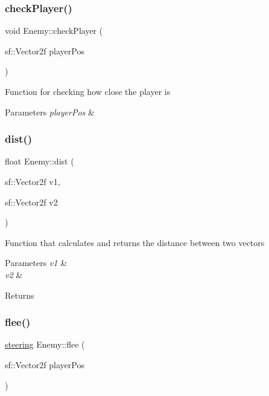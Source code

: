 \subsubsection{\texorpdfstring{checkPlayer()}{checkPlayer()}}
{\footnotesize\ttfamily void Enemy\+::check\+Player (\begin{DoxyParamCaption}\item[{sf\+::\+Vector2f}]{player\+Pos }\end{DoxyParamCaption})}



Function for checking how close the player is 


\begin{DoxyParams}{Parameters}
{\em player\+Pos} & \\
\hline
\end{DoxyParams}
\mbox{\label{class_enemy_a20f703afc06d0024fdfad521738f9a06}} 
\subsubsection{\texorpdfstring{dist()}{dist()}}
{\footnotesize\ttfamily float Enemy\+::dist (\begin{DoxyParamCaption}\item[{sf\+::\+Vector2f}]{v1,  }\item[{sf\+::\+Vector2f}]{v2 }\end{DoxyParamCaption})}



Function that calculates and returns the distance between two vectors 


\begin{DoxyParams}{Parameters}
{\em v1} & \\
\hline
{\em v2} & \\
\hline
\end{DoxyParams}
\begin{DoxyReturn}{Returns}

\end{DoxyReturn}
\mbox{\label{class_enemy_abf2799c252b07c51054dea9b6d5cdfee}} 
\subsubsection{\texorpdfstring{flee()}{flee()}}
{\footnotesize\ttfamily \mbox{\hyperlink{structsteering}{steering}} Enemy\+::flee (\begin{DoxyParamCaption}\item[{sf\+::\+Vector2f}]{player\+Pos }\end{DoxyParamCaption})}



